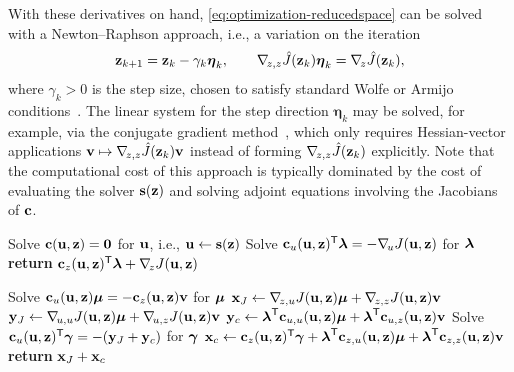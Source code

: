 With these derivatives on hand, \cref{eq:optimization-reducedspace} can be solved with a Newton--Raphson approach, i.e., a variation on the iteration
\begin{align}
    \label{eq:newton-cg}
    \mathbf{z}_{k+1}
    = \mathbf{z}_{k} - \gamma_k\boldsymbol{\eta}_k,
    \qquad
    \nabla_{\!z,z}\hat{J}(\mathbf{z}_{k})\boldsymbol{\eta}_{k} = \nabla_{\!z}\hat{J}(\mathbf{z}_{k}),
\end{align}
where $\gamma_k > 0$ is the step size, chosen to satisfy standard Wolfe or Armijo conditions~\cite{armijo1966minimization,wolfe1969conditions}.
The linear system for the step direction $\boldsymbol{\eta}_{k}$ may be solved, for example, via the conjugate gradient method~\cite{hestenes1952conjugategradient}, which only requires Hessian-vector applications $\mathbf{v}\mapsto\nabla_{\!z,z}\hat{J}(\mathbf{z}_k)\mathbf{v}$ instead of forming $\nabla_{\!z,z}\hat{J}(\mathbf{z}_k)$ explicitly.
Note that the computational cost of this approach is typically dominated by the cost of evaluating the solver $\mathbf{s}(\mathbf{z})$ and solving adjoint equations involving the Jacobians of $\mathbf{c}$.

\begin{algorithm}[t]
\begin{algorithmic}[1]
    \State Solve $\mathbf{c}(\mathbf{u}, \mathbf{z}) = \mathbf{0}$ for $\mathbf{u}$, i.e., $\mathbf{u} \gets \mathbf{s}(\mathbf{z})$
    \State Solve $\mathbf{c}_u(\mathbf{u},\mathbf{z})^{\mathsf{T}} \boldsymbol{\lambda} = - \nabla_{\!u}J(\mathbf{u},\mathbf{z})$ for $\boldsymbol{\lambda}$
    \State \textbf{return} $\mathbf{c}_z(\mathbf{u},\mathbf{z})^{\mathsf{T}} \boldsymbol{\lambda} + \nabla_{\!z}J(\mathbf{u},\mathbf{z})$
\EndProcedure
\end{algorithmic}
\caption{Adjoint-based gradient $\grad{z}\hat{J}(\z)$ for minimizing \cref{eq:optimization-reducedspace}.}
\label{alg:adjoint-gradient}
\end{algorithm}

\begin{algorithm}[t]
\begin{algorithmic}[1]
    \State Solve $\mathbf{c}_u(\mathbf{u},\mathbf{z}) \boldsymbol{\mu} = -\mathbf{c}_z(\mathbf{u},\mathbf{z}) \mathbf{v}$ for $\boldsymbol{\mu}$
    \State $\mathbf{x}_J \gets \nabla_{\!z,u}J(\mathbf{u},\mathbf{z}) \boldsymbol{\mu} +  \nabla_{\!z,z}J(\mathbf{u},\mathbf{z}) \mathbf{v}$
    \State $\mathbf{y}_J \gets \nabla_{\!u,u}J(\mathbf{u},\mathbf{z}) \boldsymbol{\mu} + \nabla_{\!u,z}J(\mathbf{u},\mathbf{z}) \mathbf{v}$
    \State $\mathbf{y}_c \gets \boldsymbol{\lambda}^{\mathsf{T}} \mathbf{c}_{u,u}(\mathbf{u},\mathbf{z}) \boldsymbol{\mu} +  \boldsymbol{\lambda}^{\mathsf{T}} \mathbf{c}_{u,z}(\mathbf{u},\mathbf{z}) \mathbf{v}$
    \State Solve $\mathbf{c}_u(\mathbf{u},\mathbf{z})^{\mathsf{T}} \boldsymbol{\gamma} = -(\mathbf{y}_J + \mathbf{y}_c)$ for $\boldsymbol{\gamma}$
    \State $\mathbf{x}_c \gets \mathbf{c}_z(\mathbf{u},\mathbf{z})^{\mathsf{T}} \boldsymbol{\gamma} + \boldsymbol{\lambda}^{\mathsf{T}} \mathbf{c}_{z,u}(\mathbf{u},\mathbf{z}) \boldsymbol{\mu} + \boldsymbol{\lambda}^{\mathsf{T}} \mathbf{c}_{z,z}(\mathbf{u},\mathbf{z})\mathbf{v}$
    \State \textbf{return} $\mathbf{x}_J + \mathbf{x}_c$
\EndProcedure
\end{algorithmic}
\caption{Adjoint-based Hessian-vector product $\v\mapsto\grad{z,z}\hat{J}(\z)\v$ for minimizing \cref{eq:optimization-reducedspace}.}
\label{alg:adjoint-hessvec}
\end{algorithm}

